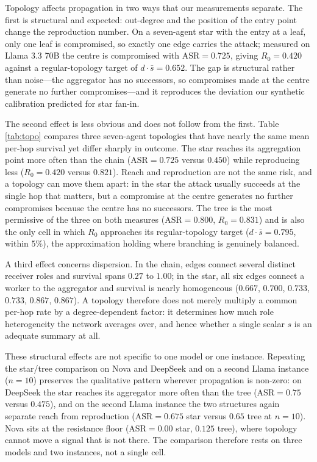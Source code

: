 \documentclass[sigconf,anonymous]{aamas}
\begin{document}
Topology affects propagation in two ways that our measurements separate. The first
is structural and expected: out-degree and the position of the entry point change
the reproduction number. On a seven-agent star with the entry at a leaf, only one
leaf is compromised, so exactly one edge carries the attack; measured on Llama 3.3
70B the centre is compromised with $\mathrm{ASR} = 0.725$, giving $R_0 = 0.420$
against a regular-topology target of $d\cdot\bar s = 0.652$. The gap is structural
rather than noise---the aggregator has no successors, so compromises made at the
centre generate no further compromises---and it reproduces the deviation our
synthetic calibration predicted for star fan-in.

The second effect is less obvious and does not follow from the first. Table
\ref{tab:topo} compares three seven-agent topologies that have nearly the same mean
per-hop survival yet differ sharply in outcome. The star reaches its aggregation
point more often than the chain ($\mathrm{ASR} = 0.725$ versus $0.450$) while
reproducing less ($R_0 = 0.420$ versus $0.821$). Reach and reproduction are not the
same risk, and a topology can move them apart: in the star the attack usually
succeeds at the single hop that matters, but a compromise at the centre generates
no further compromises because the centre has no successors. The tree is the most
permissive of the three on both measures ($\mathrm{ASR} = 0.800$,
$R_0 = 0.831$) and is also the only cell in which $R_0$ approaches its
regular-topology target ($d\cdot\bar s = 0.795$, within $5\%$), the approximation
holding where branching is genuinely balanced.

A third effect concerns dispersion. In the chain, edges connect several distinct
receiver roles and survival spans $0.27$ to $1.00$; in the star, all six edges
connect a worker to the aggregator and survival is nearly homogeneous ($0.667$,
$0.700$, $0.733$, $0.733$, $0.867$, $0.867$). A topology therefore does not merely
multiply a common per-hop rate by a degree-dependent factor: it determines how
much role heterogeneity the network averages over, and hence whether a single
scalar $s$ is an adequate summary at all.

These structural effects are not specific to one model or one instance. Repeating
the star/tree comparison on Nova and DeepSeek and on a second Llama instance
($n = 10$) preserves the qualitative pattern wherever propagation is non-zero: on
DeepSeek the star reaches its aggregator more often than the tree
($\mathrm{ASR} = 0.75$ versus $0.475$), and on the second Llama instance the two
structures again separate reach from reproduction ($\mathrm{ASR} = 0.675$ star
versus $0.65$ tree at $n = 10$). Nova sits at the resistance floor
($\mathrm{ASR} = 0.00$ star, $0.125$ tree), where topology cannot move a signal that
is not there. The comparison therefore rests on three models and two instances, not
a single cell.
\end{document}
